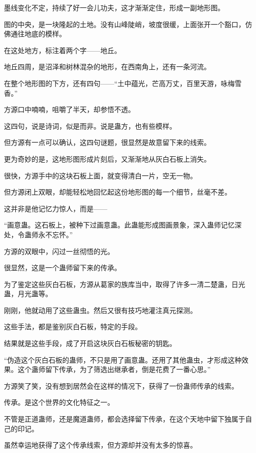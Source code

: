 
\begin{this_body}

墨线变化不定，持续了好一会儿功夫，这才渐渐定住，形成一副地形图。

图的中央，是一块隆起的土地。没有山峰陡峭，坡度很缓，上面张开一个豁口，仿佛通往地底的模样。

在这处地方，标注着两个字——地丘。

地丘四周，是沼泽和树林混杂的地形，在西南角上，还有一条河流。

在整个地形图的下方，还有四句——“土中蕴光，芒高万丈，百里天游，咏梅雪香。”

方源口中喃喃，咀嚼了半天，却参悟不透。

这四句，说是诗词，似是而非。说是蛊方，也有些模样。

但方源有一点可以确认，这四句谜题，很显然是故意留下来的线索。

更为奇妙的是，这地形图形成片刻后，又渐渐地从灰白石板上消失。

很快，方源手中的这块石板上面，就变得清白一片，空无一物。

但方源闭上双眼，却能轻松地回忆起这份地形图的每一个细节，丝毫不差。

这并非是他记忆力惊人，而是——

“画意蛊。这石板上，被种下过画意蛊。此蛊能形成图画景象，深入蛊师记忆深处，令蛊师永不忘怀。”

方源的双眼中，闪过一丝彻悟的光。

很显然，这是一个蛊师留下来的传承。

为了鉴定这些灰白石板，方源从葛家的族库当中，取得了许多一清二楚蛊，日光蛊，月光蛊等。

刚刚，他就动用了这些蛊虫。然后又很有技巧地灌注真元探测。

这些手法，都是鉴别灰白石板，特定的手段。

结果就是这些手段，成了开启这块灰白石板秘密的钥匙。

“伪造这个灰白石板的蛊师，不只是用了画意蛊。还用了其他蛊虫，才形成这种效果。这个蛊师留下传承，为了筛选出继承者，倒是花费了一番心思。”

方源笑了笑，没有想到居然会在这样的情况下，获得了一份蛊师传承的线索。

传承。是这个世界的文化特征之一。

不管是正道蛊师，还是魔道蛊师，都会选择留下传承，在这个天地中留下独属于自己的印记。

虽然幸运地获得了这个传承线索，但方源却并没有太多的惊喜。


\end{this_body}
